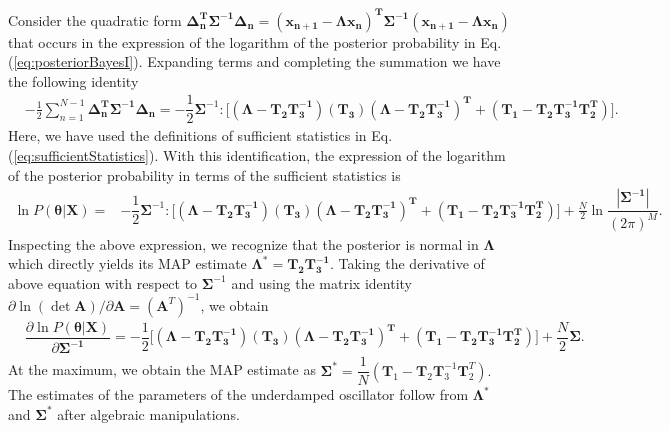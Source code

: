 \documentclass[english,aps, twocolumn, pre,superscriptaddress, notitlepage]{revtex4-1}
\begin{document}
Consider the quadratic form $\bm{\Delta_{n}^{T}\Sigma^{-1}\Delta_{n}}=\left(\bm{x_{n+1}}-\bm{\Lambda}\bm{x_{n}}\right)^{\bm{T}}\bm{\Sigma^{-1}}\left(\bm{x_{n+1}}-\bm{\Lambda}\bm{x_{n}}\right)$
that occurs in the expression of the logarithm of the posterior probability
in Eq.(\ref{eq:posteriorBayesI}). Expanding terms and completing
the summation we have the following identity
\begin{align}
 & -\frac{1}{2}\sum_{n=1}^{N-1}\bm{\Delta_{n}^{T}\Sigma^{-1}\Delta_{n}}=-\dfrac{1}{2}\bm{\Sigma}^{-1}:\Big[\left(\bm{\Lambda}-\bm{T_{2}T_{3}^{-1}}\right)\left(\bm{T_{3}}\right)\left(\bm{\Lambda}-\bm{T_{2}T_{3}^{-1}}\right)^{\bm{T}}+\left(\bm{T_{1}}-\bm{T_{2}T_{3}^{-1}T_{2}^{T}}\right)\Big].\label{eq:lp}
\end{align}
Here, we have used the definitions of sufficient statistics in Eq.
(\ref{eq:sufficientStatistics}). With this identification, the expression
of the logarithm of the posterior probability in terms of the sufficient
statistics is
\begin{align}
\ln P\left(\bm{\theta}\vert\bm{X}\right)= & -\dfrac{1}{2}\bm{\Sigma}^{-1}:\Big[\left(\bm{\Lambda}-\bm{T_{2}T_{3}^{-1}}\right)\left(\bm{T_{3}}\right)\left(\bm{\Lambda}-\bm{T_{2}T_{3}^{-1}}\right)^{\bm{T}}+\left(\bm{T_{1}}-\bm{T_{2}T_{3}^{-1}T_{2}^{T}}\right)\Big]+\frac{N}{2}\ln\dfrac{|\bm{\Sigma^{-1}}|}{(2\pi)^{M}}.
\end{align}
Inspecting the above expression, we recognize that the posterior is
normal in $\boldsymbol{\Lambda}$ which directly yields its MAP estimate
$\boldsymbol{\Lambda^{\ast}}=\bm{T_{2}T_{3}^{-1}}$. Taking the derivative
of above equation with respect to $\boldsymbol{\Sigma}^{-1}$ and
using the matrix identity $\partial\ln\left(\det\bm{A}\right)/\partial\bm{A}=\left(\bm{A}^{T}\right)^{-1}$,
we obtain
\begin{align}
 & \dfrac{\partial\ln P\left(\bm{\theta}\vert\bm{X}\right)}{\partial\bm{\Sigma^{-1}}}=-\dfrac{1}{2}\Big[\left(\bm{\Lambda}-\bm{T_{2}T_{3}^{-1}}\right)\left(\bm{T_{3}}\right)\left(\bm{\Lambda}-\bm{T_{2}T_{3}^{-1}}\right)^{\bm{T}}+\left(\bm{T_{1}}-\bm{T_{2}T_{3}^{-1}T_{2}^{T}}\right)\Big]+\dfrac{N}{2}\bm{\Sigma}.
\end{align}
At the maximum, we obtain the MAP estimate as $\bm{\Sigma^{\ast}}=\dfrac{1}{N}\left(\bm{T}_{1}-\boldsymbol{T}_{2}\boldsymbol{T}_{3}^{-1}\boldsymbol{T}_{2}^{T}\right).$
The estimates of the parameters of the underdamped oscillator follow
from $\bm{\Lambda^{\ast}}$ and $\bm{\Sigma^{\ast}}$ after algebraic
manipulations. 
\end{document}
